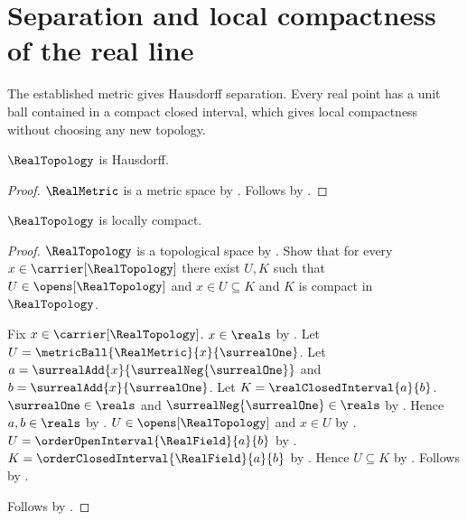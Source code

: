 \section{Separation and local compactness of the real line}




The established metric gives Hausdorff separation. Every real point has a
unit ball contained in a compact closed interval, which gives local
compactness without choosing any new topology.

\begin{theorem}\label{real_topology_is_hausdorff}
    $\RealTopology$ is Hausdorff.
\end{theorem}
\begin{proof}
    $\RealMetric$ is a metric space by .
    Follows by .
\end{proof}

\begin{theorem}\label{real_topology_is_locally_compact}
    $\RealTopology$ is locally compact.
\end{theorem}
\begin{proof}
    $\RealTopology$ is a topological space by .
    Show that for every $x\in\carrier[\RealTopology]$ there exist $U,K$ such that
        $U\in\opens[\RealTopology]$ and $x\in U\subseteq K$ and $K$ is compact in $\RealTopology$.
    \begin{subproof}
        Fix $x\in\carrier[\RealTopology]$.
        $x\in\reals$ by .
        Let $U=\metricBall{\RealMetric}{x}{\surrealOne}$.
        Let $a=\surrealAdd{x}{\surrealNeg{\surrealOne}}$ and $b=\surrealAdd{x}{\surrealOne}$.
        Let $K=\realClosedInterval{a}{b}$.
        $\surrealOne\in\reals$ and $\surrealNeg{\surrealOne}\in\reals$ by
            .
        Hence $a,b\in\reals$ by .
        $U\in\opens[\RealTopology]$ and $x\in U$ by .
        $U=\orderOpenInterval{\RealField}{a}{b}$ by .
        $K=\orderClosedInterval{\RealField}{a}{b}$ by .
        Hence $U\subseteq K$ by
            .
        Follows by .
    \end{subproof}
    Follows by .
\end{proof}
